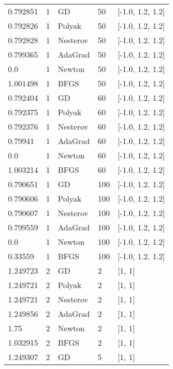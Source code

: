 \begin{tabular}{lllll}
  0.792851 &        1 &       GD &     50 & [-1.0, 1.2, 1.2] \\
  0.792826 &        1 &   Polyak &     50 & [-1.0, 1.2, 1.2] \\
  0.792828 &        1 & Nesterov &     50 & [-1.0, 1.2, 1.2] \\
  0.799365 &        1 &  AdaGrad &     50 & [-1.0, 1.2, 1.2] \\
       0.0 &        1 &   Newton &     50 & [-1.0, 1.2, 1.2] \\
  1.001498 &        1 &     BFGS &     50 & [-1.0, 1.2, 1.2] \\
  0.792404 &        1 &       GD &     60 & [-1.0, 1.2, 1.2] \\
  0.792375 &        1 &   Polyak &     60 & [-1.0, 1.2, 1.2] \\
  0.792376 &        1 & Nesterov &     60 & [-1.0, 1.2, 1.2] \\
   0.79941 &        1 &  AdaGrad &     60 & [-1.0, 1.2, 1.2] \\
       0.0 &        1 &   Newton &     60 & [-1.0, 1.2, 1.2] \\
  1.003214 &        1 &     BFGS &     60 & [-1.0, 1.2, 1.2] \\
  0.790651 &        1 &       GD &    100 & [-1.0, 1.2, 1.2] \\
  0.790606 &        1 &   Polyak &    100 & [-1.0, 1.2, 1.2] \\
  0.790607 &        1 & Nesterov &    100 & [-1.0, 1.2, 1.2] \\
  0.799559 &        1 &  AdaGrad &    100 & [-1.0, 1.2, 1.2] \\
       0.0 &        1 &   Newton &    100 & [-1.0, 1.2, 1.2] \\
   0.33559 &        1 &     BFGS &    100 & [-1.0, 1.2, 1.2] \\
  1.249723 &        2 &       GD &      2 &           [1, 1] \\
  1.249721 &        2 &   Polyak &      2 &           [1, 1] \\
  1.249721 &        2 & Nesterov &      2 &           [1, 1] \\
  1.249856 &        2 &  AdaGrad &      2 &           [1, 1] \\
      1.75 &        2 &   Newton &      2 &           [1, 1] \\
  1.032915 &        2 &     BFGS &      2 &           [1, 1] \\
  1.249307 &        2 &       GD &      5 &           [1, 1] \\

\end{tabular}
